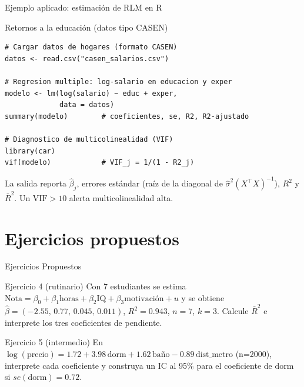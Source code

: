 \documentclass{beamer}
\begin{document}
\begin{frame}[fragile]{Ejemplo aplicado: estimación de RLM en R}

\begin{exampleblock}{Retornos a la educación (datos tipo CASEN)}
\begin{verbatim}
# Cargar datos de hogares (formato CASEN)
datos <- read.csv("casen_salarios.csv")

# Regresion multiple: log-salario en educacion y exper
modelo <- lm(log(salario) ~ educ + exper,
             data = datos)
summary(modelo)        # coeficientes, se, R2, R2-ajustado

# Diagnostico de multicolinealidad (VIF)
library(car)
vif(modelo)            # VIF_j = 1/(1 - R2_j)
\end{verbatim}
\end{exampleblock}

{\small La salida reporta $\hat{\beta}_j$, errores estándar (raíz de la diagonal de $\hat{\sigma}^2(X^{\top}X)^{-1}$), $R^2$ y $\bar{R}^2$. Un $\text{VIF}>10$ alerta multicolinealidad alta.}

\end{frame}

\section{Ejercicios propuestos}

\begin{frame}{Ejercicios Propuestos}

\begin{block}{Ejercicio 4 (rutinario)}
Con 7 estudiantes se estima $\text{Nota}=\beta_0+\beta_1\text{horas}+\beta_2\text{IQ}+\beta_3\text{motivación}+u$ y se obtiene $\hat{\beta}=(-2.55,\,0.77,\,0.045,\,0.011)$, $R^2=0.943$, $n=7$, $k=3$. Calcule $\bar{R}^2$ e interprete los tres coeficientes de pendiente.
\end{block}

\begin{block}{Ejercicio 5 (intermedio)}
En $\log(\text{precio})=1.72+3.98\,\text{dorm}+1.62\,\text{baño}-0.89\,\text{dist\_metro}$ (n=2000), interprete cada coeficiente y construya un IC al 95\% para el coeficiente de $\text{dorm}$ si $se(\text{dorm})=0.72$.
\end{block}

\end{frame}
\end{document}

